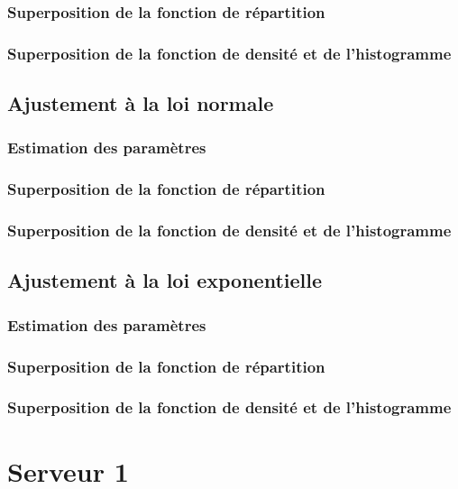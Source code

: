 \documentclass{article}
\begin{document}
\subsubsection{Superposition de la fonction de répartition}
\subsubsection{Superposition de la fonction de densité et de l'histogramme}

\subsection{Ajustement à la loi normale}

\subsubsection{Estimation des paramètres}
\subsubsection{Superposition de la fonction de répartition}
\subsubsection{Superposition de la fonction de densité et de l'histogramme}

\subsection {Ajustement à la loi exponentielle}

\subsubsection{Estimation des paramètres}
\subsubsection{Superposition de la fonction de répartition}
\subsubsection{Superposition de la fonction de densité et de l'histogramme}

\section{Serveur 1}
\end{document}
